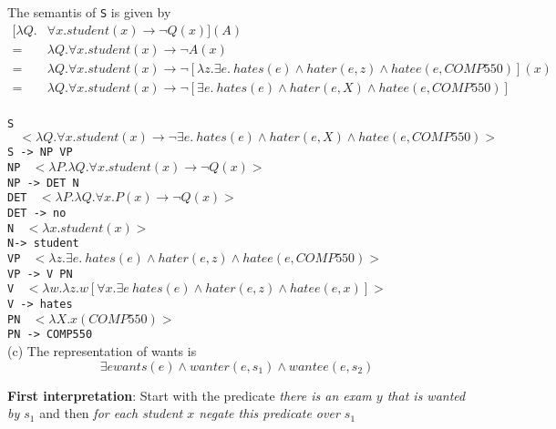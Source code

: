 \documentclass[12pt]{article}
\begin{document}
The semantis of \texttt{S} is given by
\begin{equation}
\begin{split}
[\lambda Q.& \forall x. student(x)\rightarrow \neg Q(x)](A)\\
=& \lambda Q. \forall x. student(x)\rightarrow \neg A(x)\\
=& \lambda Q. \forall x. student(x)\rightarrow \neg [\lambda z.\exists e. ~hates(e)\land hater(e, z) \land hatee(e, COMP550)](x)\\
=& \lambda Q. \forall x. student(x)\rightarrow \neg [\exists e. ~hates(e)\land hater(e, X) \land hatee(e, COMP550)]\\
\end{split}
\end{equation}

\texttt{S}$~~~~<\lambda Q. \forall x. student(x)\rightarrow \neg \exists e. ~hates(e)\land hater(e, X) \land hatee(e, COMP550)>$\\
\texttt{S -> NP VP}\\

\texttt{NP}$~~~~<\lambda P. \lambda Q. \forall x. student(x)\rightarrow \neg Q(x)>$\\
\texttt{NP -> DET N}\\

\texttt{DET}$~~~~<\lambda P. \lambda Q. \forall x. P(x)\rightarrow \neg Q(x)>$\\
\texttt{DET -> no}\\

\texttt{N}$~~~~<\lambda x. student(x)>$\\
\texttt{N-> student}\\

\texttt{VP}$~~~~<\lambda z.\exists e. ~hates(e)\land hater(e, z) \land hatee(e, COMP550)>$\\
\texttt{VP -> V PN}\\

\texttt{V}$~~~~<\lambda w. \lambda z. w[\forall x. \exists e~ hates(e) \land hater(e,z) \land hatee(e, x)]>$\\
\texttt{V -> hates}\\

\texttt{PN}$~~~~<\lambda X. x(COMP550)>$\\
\texttt{PN -> COMP550}\\

(c) The representation of wants is
\[
	\exists e wants(e) \land wanter(e, s_1) \land wantee(e, s_2)
\]

\textbf{First interpretation}: Start with the predicate \textit{there is an exam $y$ that is wanted by $s_1$} and then \textit{for each student $x$ negate this predicate over $s_1$}
\end{document}
